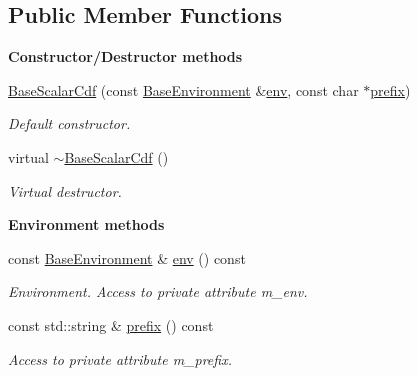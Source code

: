 \subsection*{Public Member Functions}
\begin{Indent}{\bf Constructor/\-Destructor methods}\par
\begin{DoxyCompactItemize}
\item 
\hyperlink{class_q_u_e_s_o_1_1_base_scalar_cdf_a4604dee9fe730564c52d8d925bc69b94}{Base\-Scalar\-Cdf} (const \hyperlink{class_q_u_e_s_o_1_1_base_environment}{Base\-Environment} \&\hyperlink{class_q_u_e_s_o_1_1_base_scalar_cdf_a70c89dd2ad294be170338a283fc58ff3}{env}, const char $\ast$\hyperlink{class_q_u_e_s_o_1_1_base_scalar_cdf_aafb3eaf3bf1d7269073e9c77bd8c766d}{prefix})
\begin{DoxyCompactList}\small\item\em Default constructor. \end{DoxyCompactList}\item 
virtual \hyperlink{class_q_u_e_s_o_1_1_base_scalar_cdf_aa7bd0ba0d3719853cc24a2e12f126600}{$\sim$\-Base\-Scalar\-Cdf} ()
\begin{DoxyCompactList}\small\item\em Virtual destructor. \end{DoxyCompactList}\end{DoxyCompactItemize}
\end{Indent}
\begin{Indent}{\bf Environment methods}\par
\begin{DoxyCompactItemize}
\item 
const \hyperlink{class_q_u_e_s_o_1_1_base_environment}{Base\-Environment} \& \hyperlink{class_q_u_e_s_o_1_1_base_scalar_cdf_a70c89dd2ad294be170338a283fc58ff3}{env} () const 
\begin{DoxyCompactList}\small\item\em Environment. Access to private attribute m\-\_\-env. \end{DoxyCompactList}\item 
const std\-::string \& \hyperlink{class_q_u_e_s_o_1_1_base_scalar_cdf_aafb3eaf3bf1d7269073e9c77bd8c766d}{prefix} () const 
\begin{DoxyCompactList}\small\item\em Access to private attribute m\-\_\-prefix. \end{DoxyCompactList}\end{DoxyCompactItemize}
\end{Indent}
